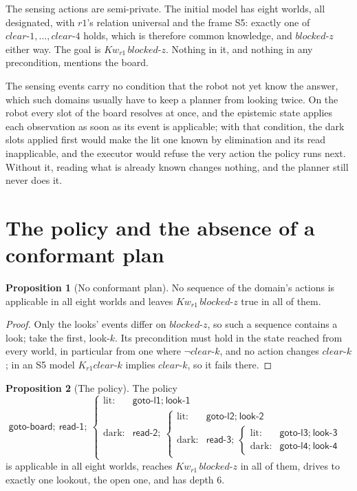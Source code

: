 \documentclass[11pt,a4paper]{article}
\theoremstyle{definition}
\newtheorem{proposition}{Proposition}
\newcommand{\Kw}[1]{\mathit{Kw}_{#1}}
\newcommand{\cl}[1]{\mathit{clear\text{-}#1}}
\newcommand{\bz}{\mathit{blocked\text{-}z}}
\newcommand{\act}[1]{\textsf{#1}}
\begin{document}
\noindent
The sensing actions are semi-private. The initial model has eight worlds, all
designated, with $r1$'s relation universal and the frame S5: exactly one of
$\cl{1}, \ldots, \cl{4}$ holds, which is therefore common knowledge, and $\bz$
either way. The goal is $\Kw{r1}\,\bz$. Nothing in it, and nothing in any
precondition, mentions the board.

The sensing events carry no condition that the robot not yet know the answer,
which such domains usually have to keep a planner from looking twice. On the
robot every slot of the board resolves at once, and the epistemic state applies
each observation as soon as its event is applicable; with that condition, the
dark slots applied first would make the lit one known by elimination and its
read inapplicable, and the executor would refuse the very action the policy
runs next. Without it, reading what is already known changes nothing, and the
planner still never does it.

\section{The policy and the absence of a conformant plan}

\begin{proposition}[No conformant plan]
No sequence of the domain's actions is applicable in all eight worlds and
leaves $\Kw{r1}\,\bz$ true in all of them.
\end{proposition}

\begin{proof}
Only the looks' events differ on $\bz$, so such a sequence contains a look;
take the first, \act{look-$k$}. Its precondition must hold in the state reached
from every world, in particular from one where $\neg\cl{k}$, and no action
changes $\cl{k}$; in an S5 model $K_{r1}\cl{k}$ implies $\cl{k}$, so it fails
there.
\end{proof}

\begin{proposition}[The policy]
The policy
\[
\act{goto-board};\ \act{read-1};\
\begin{cases}
\text{lit}: & \act{goto-l1};\ \act{look-1}\\
\text{dark}: & \act{read-2};\
\begin{cases}
\text{lit}: & \act{goto-l2};\ \act{look-2}\\
\text{dark}: & \act{read-3};\
\begin{cases}
\text{lit}: & \act{goto-l3};\ \act{look-3}\\
\text{dark}: & \act{goto-l4};\ \act{look-4}
\end{cases}
\end{cases}
\end{cases}
\]
is applicable in all eight worlds, reaches $\Kw{r1}\,\bz$ in all of them, drives
to exactly one lookout, the open one, and has depth 6.
\end{proposition}
\end{document}
